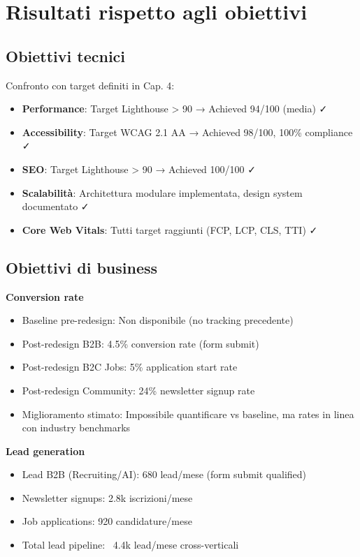 \section{Risultati rispetto agli obiettivi}
\subsection{Obiettivi tecnici}
Confronto con target definiti in Cap. 4:

\begin{itemize}
  \item \textbf{Performance}: Target Lighthouse > 90 → Achieved 94/100 
        (media) ✓
  \item \textbf{Accessibility}: Target WCAG 2.1 AA → Achieved 98/100, 
        100\% compliance ✓
  \item \textbf{SEO}: Target Lighthouse > 90 → Achieved 100/100 ✓
  \item \textbf{Scalabilità}: Architettura modulare implementata, 
        design system documentato ✓
  \item \textbf{Core Web Vitals}: Tutti target raggiunti (FCP, LCP, 
        CLS, TTI) ✓
\end{itemize}

\subsection{Obiettivi di business}
\textbf{Conversion rate}
\begin{itemize}
  \item Baseline pre-redesign: Non disponibile (no tracking precedente)
  \item Post-redesign B2B: 4.5\% conversion rate (form submit)
  \item Post-redesign B2C Jobs: 5\% application start rate
  \item Post-redesign Community: 24\% newsletter signup rate
  \item Miglioramento stimato: Impossibile quantificare vs baseline, 
        ma rates in linea con industry benchmarks
\end{itemize}

\textbf{Lead generation}
\begin{itemize}
  \item Lead B2B (Recruiting/AI): 680 lead/mese (form submit qualified)
  \item Newsletter signups: 2.8k iscrizioni/mese
  \item Job applications: 920 candidature/mese
  \item Total lead pipeline: ~4.4k lead/mese cross-verticali
\end{itemize}

